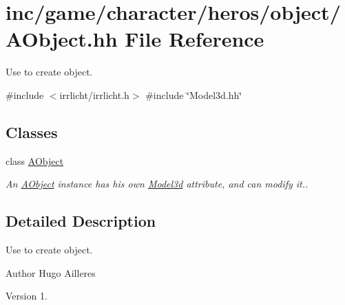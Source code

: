 \hypertarget{AObject_8hh}{}\section{inc/game/character/heros/object/\+A\+Object.hh File Reference}
\label{AObject_8hh}


Use to create object.  


{\ttfamily \#include $<$irrlicht/irrlicht.\+h$>$}\newline
{\ttfamily \#include \char`\"{}Model3d.\+hh\char`\"{}}\newline
\subsection*{Classes}
\begin{DoxyCompactItemize}
\item 
class \hyperlink{classAObject}{A\+Object}
\begin{DoxyCompactList}\small\item\em An \hyperlink{classAObject}{A\+Object} instance has his own \hyperlink{classModel3d}{Model3d} attribute, and can modify it.. \end{DoxyCompactList}\end{DoxyCompactItemize}


\subsection{Detailed Description}
Use to create object. 

\begin{DoxyAuthor}{Author}
Hugo Ailleres 
\end{DoxyAuthor}
\begin{DoxyVersion}{Version}
1. 
\end{DoxyVersion}
